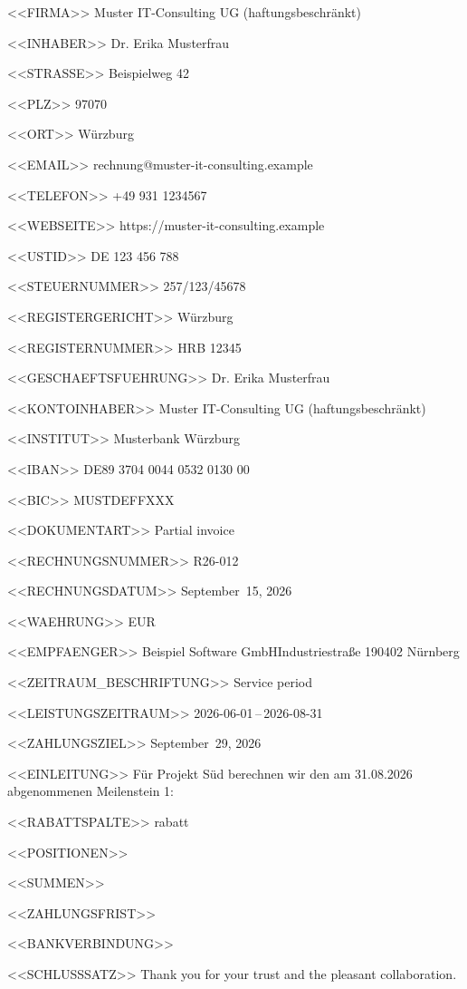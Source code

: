 <<FIRMA>>
Muster IT-Consulting UG (haftungsbeschränkt)

<<INHABER>>
Dr. Erika Musterfrau

<<STRASSE>>
Beispielweg 42

<<PLZ>>
97070

<<ORT>>
Würzburg

<<EMAIL>>
rechnung@muster-it-consulting.example

<<TELEFON>>
+49 931 1234567

<<WEBSEITE>>
https://muster-it-consulting.example

<<USTID>>
DE 123 456 788

<<STEUERNUMMER>>
257/123/45678

<<REGISTERGERICHT>>
Würzburg

<<REGISTERNUMMER>>
HRB 12345

<<GESCHAEFTSFUEHRUNG>>
Dr. Erika Musterfrau

<<KONTOINHABER>>
Muster IT-Consulting UG (haftungsbeschränkt)

<<INSTITUT>>
Musterbank Würzburg

<<IBAN>>
DE89 3704 0044 0532 0130 00

<<BIC>>
MUSTDEFFXXX

<<DOKUMENTART>>
Partial invoice

<<RECHNUNGSNUMMER>>
R26-012

<<RECHNUNGSDATUM>>
September~15, 2026

<<WAEHRUNG>>
EUR

<<EMPFAENGER>>
Beispiel Software GmbH\zeilenwechsel{}Industriestraße 1\zeilenwechsel{}90402 Nürnberg

<<ZEITRAUM_BESCHRIFTUNG>>
Service period

<<LEISTUNGSZEITRAUM>>
2026-06-01\,–\,2026-08-31

<<ZAHLUNGSZIEL>>
September~29, 2026

<<EINLEITUNG>>
Für Projekt Süd berechnen wir den am 31.08.2026 abgenommenen Meilenstein 1:

<<RABATTSPALTE>>
rabatt

<<POSITIONEN>>
 \positionstrenner{}
 \positionstrenner{}

<<SUMMEN>>
   \summentrenner{}

<<ZAHLUNGSFRIST>>

<<BANKVERBINDUNG>>
\bankblock{}

<<SCHLUSSSATZ>>
Thank you for your trust and the pleasant collaboration.
